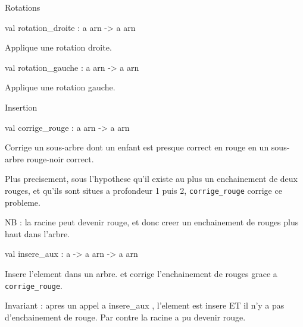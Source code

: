 \documentclass[11pt]{article}
\begin{document}
Rotations



\label{val:Arn-underscoredoc.rotation-underscoredroite}\begin{ocamldoccode}
val rotation_droite : {\textquotesingle}a arn -> {\textquotesingle}a arn
\end{ocamldoccode}
\begin{ocamldocdescription}
Applique une rotation droite.


\end{ocamldocdescription}




\label{val:Arn-underscoredoc.rotation-underscoregauche}\begin{ocamldoccode}
val rotation_gauche : {\textquotesingle}a arn -> {\textquotesingle}a arn
\end{ocamldoccode}
\begin{ocamldocdescription}
Applique une rotation gauche.


\end{ocamldocdescription}




Insertion



\label{val:Arn-underscoredoc.corrige-underscorerouge}\begin{ocamldoccode}
val corrige_rouge : {\textquotesingle}a arn -> {\textquotesingle}a arn
\end{ocamldoccode}
\begin{ocamldocdescription}
Corrige un sous-arbre dont un enfant est presque
    correct en rouge en un sous-arbre rouge-noir correct.


    Plus precisement, sous l'hypothese qu'il
    existe au plus un enchainement de deux rouges,
    et qu'ils sont situes a profondeur 1 puis 2, 
    {\tt{corrige\_rouge}} corrige ce probleme.


    NB : la racine peut devenir rouge, et donc creer un
    enchainement de rouges plus haut dans l'arbre.


\end{ocamldocdescription}




\label{val:Arn-underscoredoc.insere-underscoreaux}\begin{ocamldoccode}
val insere_aux : {\textquotesingle}a -> {\textquotesingle}a arn -> {\textquotesingle}a arn
\end{ocamldoccode}
\begin{ocamldocdescription}
Insere l'element dans un arbre.
    et corrige l'enchainement de rouges grace a {\tt{corrige\_rouge}}.


    Invariant : apres un appel a insere\_aux , 
             l'element est insere
             ET il n'y a pas d'enchainement de rouge.
             Par contre la racine a pu devenir rouge.


\end{ocamldocdescription}
\end{document}
